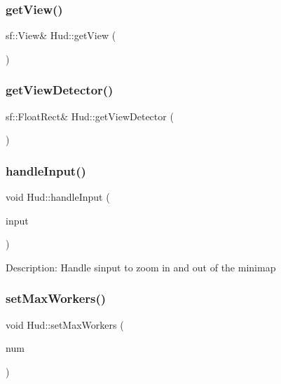 \mbox{\label{class_hud_a3dbe2361eec00c3b2834351e4dbe6b1d}} 
\subsubsection{\texorpdfstring{getView()}{getView()}}
{\footnotesize\ttfamily sf\+::\+View\& Hud\+::get\+View (\begin{DoxyParamCaption}{ }\end{DoxyParamCaption})\hspace{0.3cm}{\ttfamily [inline]}}

\mbox{\label{class_hud_a4b838665eb682780fbec8602871ef611}} 
\subsubsection{\texorpdfstring{getViewDetector()}{getViewDetector()}}
{\footnotesize\ttfamily sf\+::\+Float\+Rect\& Hud\+::get\+View\+Detector (\begin{DoxyParamCaption}{ }\end{DoxyParamCaption})\hspace{0.3cm}{\ttfamily [inline]}}

\mbox{\label{class_hud_a68616386d3e44eef176ec9cfa4e68dbe}} 
\subsubsection{\texorpdfstring{handleInput()}{handleInput()}}
{\footnotesize\ttfamily void Hud\+::handle\+Input (\begin{DoxyParamCaption}\item[{\mbox{\hyperlink{class_input_handler}{Input\+Handler}} \&}]{input }\end{DoxyParamCaption})}

Description\+: Handle sinput to zoom in and out of the minimap \mbox{\label{class_hud_a92f4216b26f6d20c62e9a89376b72717}} 
\subsubsection{\texorpdfstring{setMaxWorkers()}{setMaxWorkers()}}
{\footnotesize\ttfamily void Hud\+::set\+Max\+Workers (\begin{DoxyParamCaption}\item[{int}]{num }\end{DoxyParamCaption})\hspace{0.3cm}{\ttfamily [inline]}}

